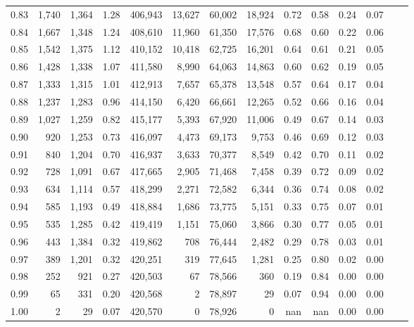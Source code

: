 \begin{tabular}{rrrrrrrrrrrrrr}
0.83 &  1,740 &  1,364 &     1.28 &  406,943 &   13,627 &  60,002 &  18,924 &  0.72 &  0.58 &  0.24 &      0.07 \\
0.84 &  1,667 &  1,348 &     1.24 &  408,610 &   11,960 &  61,350 &  17,576 &  0.68 &  0.60 &  0.22 &      0.06 \\
0.85 &  1,542 &  1,375 &     1.12 &  410,152 &   10,418 &  62,725 &  16,201 &  0.64 &  0.61 &  0.21 &      0.05 \\
0.86 &  1,428 &  1,338 &     1.07 &  411,580 &    8,990 &  64,063 &  14,863 &  0.60 &  0.62 &  0.19 &      0.05 \\
0.87 &  1,333 &  1,315 &     1.01 &  412,913 &    7,657 &  65,378 &  13,548 &  0.57 &  0.64 &  0.17 &      0.04 \\
0.88 &  1,237 &  1,283 &     0.96 &  414,150 &    6,420 &  66,661 &  12,265 &  0.52 &  0.66 &  0.16 &      0.04 \\
0.89 &  1,027 &  1,259 &     0.82 &  415,177 &    5,393 &  67,920 &  11,006 &  0.49 &  0.67 &  0.14 &      0.03 \\
0.90 &    920 &  1,253 &     0.73 &  416,097 &    4,473 &  69,173 &   9,753 &  0.46 &  0.69 &  0.12 &      0.03 \\
0.91 &    840 &  1,204 &     0.70 &  416,937 &    3,633 &  70,377 &   8,549 &  0.42 &  0.70 &  0.11 &      0.02 \\
0.92 &    728 &  1,091 &     0.67 &  417,665 &    2,905 &  71,468 &   7,458 &  0.39 &  0.72 &  0.09 &      0.02 \\
0.93 &    634 &  1,114 &     0.57 &  418,299 &    2,271 &  72,582 &   6,344 &  0.36 &  0.74 &  0.08 &      0.02 \\
0.94 &    585 &  1,193 &     0.49 &  418,884 &    1,686 &  73,775 &   5,151 &  0.33 &  0.75 &  0.07 &      0.01 \\
0.95 &    535 &  1,285 &     0.42 &  419,419 &    1,151 &  75,060 &   3,866 &  0.30 &  0.77 &  0.05 &      0.01 \\
0.96 &    443 &  1,384 &     0.32 &  419,862 &      708 &  76,444 &   2,482 &  0.29 &  0.78 &  0.03 &      0.01 \\
0.97 &    389 &  1,201 &     0.32 &  420,251 &      319 &  77,645 &   1,281 &  0.25 &  0.80 &  0.02 &      0.00 \\
0.98 &    252 &    921 &     0.27 &  420,503 &       67 &  78,566 &     360 &  0.19 &  0.84 &  0.00 &      0.00 \\
0.99 &     65 &    331 &     0.20 &  420,568 &        2 &  78,897 &      29 &  0.07 &  0.94 &  0.00 &      0.00 \\
1.00 &      2 &     29 &     0.07 &  420,570 &        0 &  78,926 &       0 &   nan &   nan &  0.00 &      0.00 \\
\bottomrule
\end{tabular}
